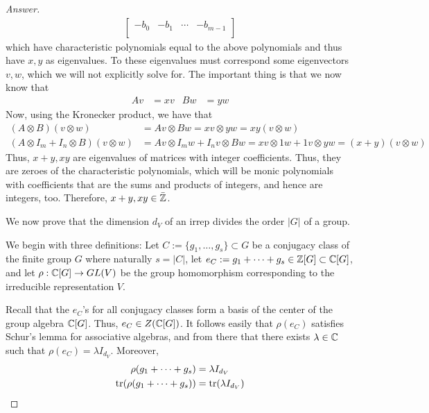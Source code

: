 \documentclass[../notes.tex]{subfiles}
\begin{document}
\begin{itemize}
\begin{proof}[Answer]
\begin{align*}
\begin{bmatrix}
                -b_0 & -b_1 & \cdots & -b_{m-1}\\
            \end{bmatrix}
        \end{align*}
        which have characteristic polynomials equal to the above polynomials and thus have $x,y$ as eigenvalues. To these eigenvalues must correspond some eigenvectors $v,w$, which we will not explicitly solve for. The important thing is that we now know that
        \begin{align*}
            Av &= xv&
            Bw &= yw
        \end{align*}
        Now, using the Kronecker product, we have that
        \begin{align*}
            (A\otimes B)(v\otimes w) &= Av\otimes Bw
                = xv\otimes yw
                = xy(v\otimes w)\\
            (A\otimes I_m+I_n\otimes B)(v\otimes w) &= Av\otimes I_mw+I_nv\otimes Bw
                = xv\otimes 1w+1v\otimes yw
                = (x+y)(v\otimes w)
        \end{align*}
        Thus, $x+y,xy$ are eigenvalues of matrices with integer coefficients. Thus, they are zeroes of the characteristic polynomials, which will be monic polynomials with coefficients that are the sums and products of integers, and hence are integers, too. Therefore, $x+y,xy\in\bar{\mathbb{Z}}$.\par\medskip
        We now prove that the dimension $d_V$ of an irrep divides the order $|G|$ of a group.\par
        We begin with three definitions: Let $C:=\{g_1,\dots,g_s\}\subset G$ be a conjugacy class of the finite group $G$ where naturally $s=|C|$, let $e_C:=g_1+\cdots+g_s\in\mathbb{Z}[G]\subset\mathbb{C}[G]$, and let $\rho:\mathbb{C}[G]\to GL(V)$ be the group homomorphism corresponding to the irreducible representation $V$.\par
        Recall that the $e_C$'s for all conjugacy classes form a basis of the center of the group algebra $\mathbb{C}[G]$. Thus, $e_C\in Z(\mathbb{C}[G])$. It follows easily that $\rho(e_C)$ satisfies Schur's lemma for associative algebras, and from there that there exists $\lambda\in\mathbb{C}$ such that $\rho(e_C)=\lambda I_{d_V}$. Moreover,
        \begin{align*}
            \rho(g_1+\cdots+g_s) &= \lambda I_{d_V}\\
            \tr(\rho(g_1+\cdots+g_s)) &= \tr(\lambda I_{d_V})\\

\end{align*}
\end{proof}
\end{itemize}
\end{document}
